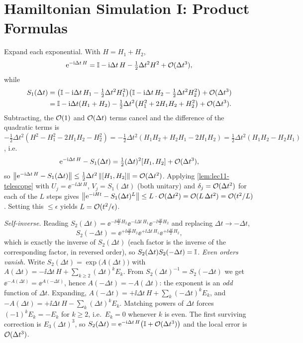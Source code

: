 \chapter{Hamiltonian Simulation I: Product Formulas}

\begin{solution}
Expand each exponential. With $H=H_1+H_2$,
\[
  \mathrm{e}^{-\mathrm{i}\Delta t\,H}=\mathbb{I}-\mathrm{i}\Delta t\,H-\tfrac12\Delta t^2 H^2+\mathcal{O}(\Delta t^3),
\]
while
\begin{align*}
  S_1(\Delta t)&=\bigl(\mathbb{I}-\mathrm{i}\Delta t\,H_1-\tfrac12\Delta t^2H_1^2\bigr)
    \bigl(\mathbb{I}-\mathrm{i}\Delta t\,H_2-\tfrac12\Delta t^2H_2^2\bigr)+\mathcal{O}(\Delta t^3)\\
  &=\mathbb{I}-\mathrm{i}\Delta t(H_1+H_2)-\tfrac12\Delta t^2\bigl(H_1^2+2H_1H_2+H_2^2\bigr)
    +\mathcal{O}(\Delta t^3).
\end{align*}
Subtracting, the $\mathcal{O}(1)$ and $\mathcal{O}(\Delta t)$ terms cancel and the difference of the
quadratic terms is $-\tfrac12\Delta t^2(H^2-H_1^2-2H_1H_2-H_2^2)
=-\tfrac12\Delta t^2(H_1H_2+H_2H_1-2H_1H_2)=\tfrac12\Delta t^2(H_1H_2-H_2H_1)$, i.e.
\[
  \mathrm{e}^{-\mathrm{i}\Delta t\,H}-S_1(\Delta t)=\tfrac12(\Delta t)^2[H_1,H_2]+\mathcal{O}(\Delta t^3),
\]
so $\left\lVert \mathrm{e}^{-\mathrm{i}\Delta t\,H}-S_1(\Delta t) \right\rVert\le\tfrac12\Delta t^2\left\lVert [H_1,H_2] \right\rVert
=\mathcal{O}(\Delta t^2)$. Applying \cref{lem:lec11-telescope} with $U_j=\ee^{-\ii\Delta t\,H}$,
$V_j=S_1(\Delta t)$ (both unitary) and $\delta_j=\mathcal{O}(\Delta t^2)$ for each of the $L$
steps gives $\left\lVert \mathrm{e}^{-\mathrm{i} Ht}-S_1(\Delta t)^L \right\rVert\le L\cdot\mathcal{O}(\Delta t^2)
=\mathcal{O}(L\,\Delta t^2)=\mathcal{O}(t^2/L)$. Setting this $\le\epsilon$ yields
$L=\mathcal{O}(t^2/\epsilon)$.
\end{solution}

\begin{solution}
\emph{Self-inverse.} Reading $S_2(\Delta t)=\ee^{-\ii\frac{\Delta t}{2}H_2}
\ee^{-\ii\Delta t\,H_1}\ee^{-\ii\frac{\Delta t}{2}H_2}$ and replacing $\Delta t\to-\Delta
t$,
\[
  S_2(-\Delta t)=\ee^{+\ii\frac{\Delta t}{2}H_2}\ee^{+\ii\Delta t\,H_1}
     \ee^{+\ii\frac{\Delta t}{2}H_2},
\]
which is exactly the inverse of $S_2(\Delta t)$ (each factor is the inverse of the
corresponding factor, in reversed order), so $S_2(\Delta t)S_2(-\Delta t)=\mathbb{I}$.
\emph{Even orders vanish.} Write $S_2(\Delta t)=\exp\bigl(A(\Delta t)\bigr)$ with
$A(\Delta t)=-\ii\Delta t\,H+\sum_{k\ge2}(\Delta t)^kE_k$. From $S_2(\Delta t)^{-1}
=S_2(-\Delta t)$ we get $\ee^{-A(\Delta t)}=\ee^{A(-\Delta t)}$, hence
$A(-\Delta t)=-A(\Delta t)$: the exponent is an \emph{odd} function of $\Delta t$.
Expanding, $A(-\Delta t)=+\ii\Delta t\,H+\sum_k(-\Delta t)^kE_k$, and $-A(\Delta t)
=+\ii\Delta t\,H-\sum_k(\Delta t)^kE_k$. Matching powers of $\Delta t$ forces
$(-1)^kE_k=-E_k$ for $k\ge2$, i.e.\ $E_k=0$ whenever $k$ is even. The first surviving
correction is $E_3(\Delta t)^3$, so
$S_2(\Delta t)=\mathrm{e}^{-\mathrm{i}\Delta t\,H}\bigl(\mathbb{I}+\mathcal{O}(\Delta t^3)\bigr)$ and the local error
is $\mathcal{O}(\Delta t^3)$.
\end{solution}

